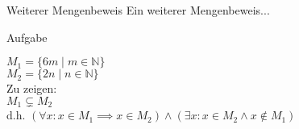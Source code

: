 %
%
%
%

\begin{frame}{Weiterer Mengenbeweis}
    Ein weiterer Mengenbeweis...
    \begin{block}{\alert{Aufgabe}}

        $M_1=\{6m \mid m \in \mathbb{N}\}$\\
        $M_2=\{2n \mid n \in \mathbb{N}\}$\\
        Zu zeigen:\\
        $M_1 \subsetneq M_2$\\
        d.h. $(\forall x: x \in M_1 \implies x \in M_2) \wedge (\exists x: x \in M_2 \land x \notin M_1)$




    \end{block}

\end{frame}

